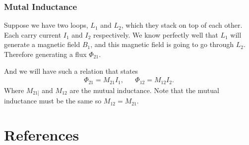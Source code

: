 \documentclass[12pt,english]{article}
\numberwithin{equation}{subsection}
\begin{document}
\subsubsection{Mutal Inductance}
Suppose we have two loops, $L_1$ and $L_2$, which they stack on top of each other. Each carry current $I_1$ and $I_2$ respectively. We know perfectly well that $L_1$ will generate a magnetic field $B_1$, and this magnetic field is going to go through $L_2$. Therefore generating a flux $\Phi_{21}$.

And we will have such a relation that states
\begin{align*}
    \Phi_{21} = M_{21} I_{1}, && \Phi_{12} = M_{12} I_{2}.
\end{align*}
Where $M_{21]}$ and $M_{12}$ are the mutual inductance. Note that the mutual inductance must be the same so $M_{12} = M_{21}$.













\newpage
\section*{References}
%
\printbibliography
[heading = none]

\end{document}
